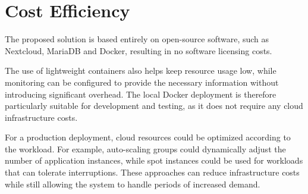 \documentclass[a4paper]{article}
\begin{document}
\section{Cost Efficiency}

The proposed solution is based entirely on open-source software, such
as Nextcloud, MariaDB and Docker, resulting in no software licensing
costs.

The use of lightweight containers also helps keep resource usage low,
while monitoring can be configured to provide the necessary information
without introducing significant overhead. The local Docker deployment
is therefore particularly suitable for development and testing, as it
does not require any cloud infrastructure costs.

For a production deployment, cloud resources could be optimized
according to the workload. For example, auto-scaling groups could
dynamically adjust the number of application instances, while spot
instances could be used for workloads that can tolerate interruptions.
These approaches can reduce infrastructure costs while still allowing
the system to handle periods of increased demand.
\end{document}
